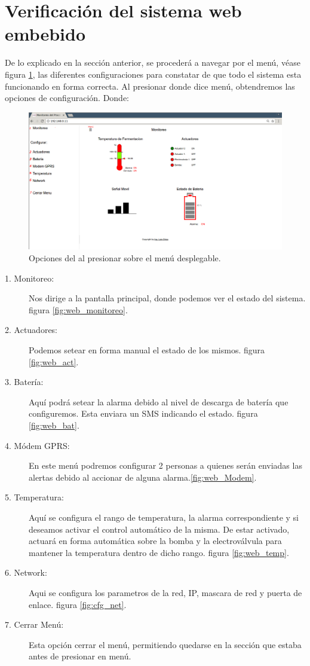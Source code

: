 \section{Verificación del sistema web embebido} 
De lo explicado en la sección anterior, se procederá a navegar por el menú, véase figura \ref{fig:web_menus_num}, las diferentes configuraciones para constatar de que todo el sistema esta funcionando en forma correcta. Al presionar donde dice menú, obtendremos las opciones de configuración. Donde:

\begin{figure}[h]
  \centering
  \includegraphics[scale=.25]{./Figures/web_menus_num.png}
  \caption{Opciones del al presionar sobre el menú desplegable.}
  \label{fig:web_menus_num}
\end{figure}



\begin{description}
  \item[1. Monitoreo:] Nos dirige a la pantalla principal, donde podemos ver el estado del sistema. figura \ref{fig:web_monitoreo}.
  \item[2. Actuadores:] Podemos setear en forma manual el estado de los mismos. figura \ref{fig:web_act}.
  \item[3. Batería:] Aquí podrá setear la alarma debido al nivel de descarga de batería que configuremos. Esta enviara un SMS indicando el estado. figura \ref{fig:web_bat}.
  \item[4. Módem GPRS:] En este menú podremos configurar 2 personas a quienes serán enviadas las alertas debido al accionar de alguna alarma.\ref{fig:web_Modem}.
  \item[5. Temperatura:] Aquí se configura el rango de temperatura, la alarma correspondiente y si deseamos activar el control automático de la misma. De estar activado, actuará en forma automática sobre la bomba y la electroválvula para mantener la temperatura dentro de dicho rango. figura \ref{fig:web_temp}.
  \item[6. Network:] Aqui se configura los parametros de la red, IP, mascara de red y puerta de enlace. figura \ref{fig:cfg_net}.
  \item[7. Cerrar Menú:] Esta opción cerrar el menú, permitiendo quedarse en la sección que estaba antes de presionar en menú.
\end{description}

